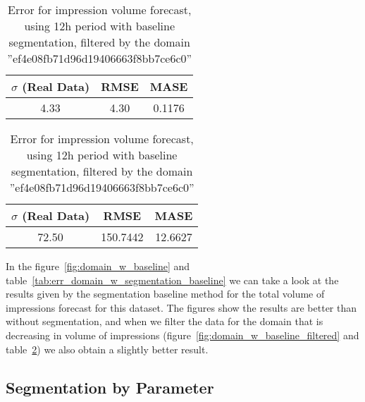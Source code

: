 \begin{table}[!ht]
\centering
\footnotesize
\begin{minipage}[t]{0.45\linewidth}
\centering
\footnotesize
\begin{tabular}{ccc}
 $\sigma$ (Real Data) & RMSE & MASE   \\ \hline
4.33 & 4.30 & 0.1176 \\
\end{tabular}

\vspace{0.5cm}

\caption[Error Volume
impression forecast, domain, filtered]{Error for impression volume
forecast, using 12h period with baseline segmentation}
\label{tab:err_domain_w_segmentation_baseline}
\end{minipage}
\quad
\begin{minipage}[t]{0.45\linewidth}
\centering
\footnotesize
\begin{tabular}{ccc}
 $\sigma$ (Real Data) & RMSE & MASE   \\ \hline
72.50 & 150.7442 & 12.6627 \\
\end{tabular}

\vspace{0.5cm}

\caption[Error Volume
impression forecast, domain, filtered]{Error for impression volume
forecast, using 12h period with baseline segmentation, filtered by the domain ''ef4e08fb71d96d19406663f8bb7ce6c0'' }
\label{tab:err_domain_w_segmentation_baseline_filtered}
\end{minipage}

\end{table}


In the figure~\ref{fig:domain_w_baseline} and
table~\ref{tab:err_domain_w_segmentation_baseline} we can take a look at the
results given by the segmentation baseline method for the total volume of
impressions forecast for this dataset. The figures show the results are better
than without segmentation, and when we filter the data for the domain that is
decreasing in volume of impressions (figure~\ref{fig:domain_w_baseline_filtered}
and table~\ref{tab:err_domain_w_segmentation_baseline_filtered}) we also obtain
a slightly better result.

\subsection*{Segmentation by Parameter}

